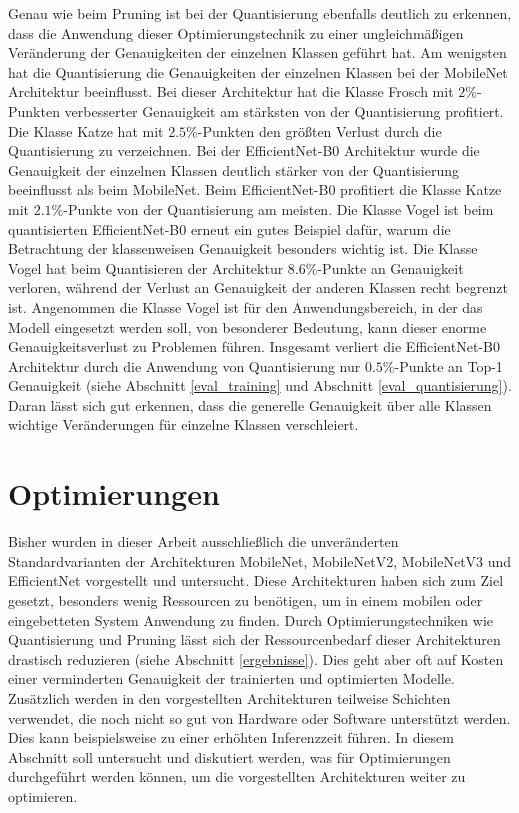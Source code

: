 Genau wie beim Pruning ist bei der Quantisierung ebenfalls deutlich zu erkennen, dass die Anwendung dieser Optimierungstechnik zu einer ungleichmäßigen Veränderung der Genauigkeiten der einzelnen Klassen geführt hat. Am wenigsten hat die Quantisierung die Genauigkeiten der einzelnen Klassen bei der MobileNet Architektur beeinflusst. Bei dieser Architektur hat die Klasse Frosch mit $2\%$-Punkten verbesserter Genauigkeit am stärksten von der Quantisierung profitiert. Die Klasse Katze hat mit $2.5\%$-Punkten den größten Verlust durch die Quantisierung zu verzeichnen. Bei der EfficientNet-B0 Architektur wurde die Genauigkeit der einzelnen Klassen deutlich stärker von der Quantisierung beeinflusst als beim MobileNet. Beim EfficientNet-B0 profitiert die Klasse Katze mit $2.1\%$-Punkte von der Quantisierung am meisten. Die Klasse Vogel ist beim quantisierten EfficientNet-B0 erneut ein gutes Beispiel dafür, warum die Betrachtung der klassenweisen Genauigkeit besonders wichtig ist. Die Klasse Vogel hat beim Quantisieren der Architektur $8.6\%$-Punkte an Genauigkeit verloren, während der Verlust an Genauigkeit der anderen Klassen recht begrenzt ist. Angenommen die Klasse Vogel ist für den Anwendungsbereich, in der das Modell eingesetzt werden soll, von besonderer Bedeutung, kann dieser enorme Genauigkeitsverlust zu Problemen führen. Insgesamt verliert die EfficientNet-B0 Architektur durch die Anwendung von Quantisierung nur $0.5\%$-Punkte an Top-1 Genauigkeit (siehe Abschnitt \ref{eval_training} und Abschnitt \ref{eval_quantisierung}). Daran lässt sich gut erkennen, dass die generelle Genauigkeit über alle Klassen wichtige Veränderungen für einzelne Klassen verschleiert.



\section{Optimierungen}
Bisher wurden in dieser Arbeit ausschließlich die unveränderten Standardvarianten der Architekturen MobileNet, MobileNetV2, MobileNetV3 und EfficientNet vorgestellt und untersucht. Diese Architekturen haben sich zum Ziel gesetzt, besonders wenig Ressourcen zu benötigen, um in einem mobilen oder eingebetteten System Anwendung zu finden. Durch Optimierungstechniken wie Quantisierung und Pruning lässt sich der Ressourcenbedarf dieser Architekturen drastisch reduzieren (siehe Abschnitt \ref{ergebnisse}). Dies geht aber oft auf Kosten einer verminderten Genauigkeit der trainierten und optimierten Modelle. Zusätzlich werden in den vorgestellten Architekturen teilweise Schichten verwendet, die noch nicht so gut von Hardware oder Software unterstützt werden. Dies kann beispielsweise zu einer erhöhten Inferenzzeit führen. In diesem Abschnitt soll untersucht und diskutiert werden, was für Optimierungen durchgeführt werden können, um die vorgestellten Architekturen weiter zu optimieren.

